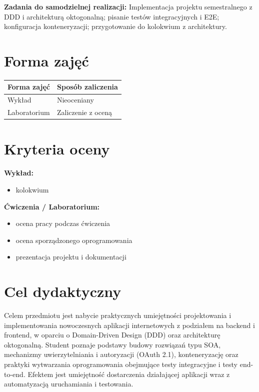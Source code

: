 \documentclass[12pt, a4paper]{article}
\newcommand{\thdrule}{\noalign{\global\setlength{\extrarowheight}{0pt}}}
\newcommand{\thdend}{\noalign{\global\setlength{\extrarowheight}{3pt}}}
\begin{document}
\vspace{4pt}
\noindent\textbf{Zadania do samodzielnej realizacji:} Implementacja projektu semestralnego z DDD i architekturą oktogonalną; pisanie testów integracyjnych i E2E; konfiguracja konteneryzacji; przygotowanie do kolokwium z architektury.

\section{Forma zajęć}

\begin{center}
{\scriptsize
\begin{tabular}{m{5cm}m{8cm}}
\thdrule\toprule
\rowcolor{pjatkRed} {\color{white}\textbf{Forma zajęć}} & {\color{white}\textbf{Sposób zaliczenia}} \\
\midrule\thdend
  \rowcolor{tableRowLight} Wykład & Nieoceniany \\
  \rowcolor{tableRowAlt} Laboratorium & Zaliczenie z oceną \\
\bottomrule
\end{tabular}}
\end{center}

\section{Kryteria oceny}

\textbf{Wykład:}
\begin{itemize}
  \item kolokwium
\end{itemize}
\vspace{4pt}
\textbf{Ćwiczenia / Laboratorium:}
\begin{itemize}
  \item ocena pracy podczas ćwiczenia
  \item ocena sporządzonego oprogramowania
  \item prezentacja projektu i dokumentacji
\end{itemize}


\section{Cel dydaktyczny}

Celem przedmiotu jest nabycie praktycznych umiejętności projektowania i implementowania nowoczesnych aplikacji internetowych z podziałem na backend i frontend, w oparciu o Domain-Driven Design (DDD) oraz architekturę oktogonalną. Student poznaje podstawy budowy rozwiązań typu SOA, mechanizmy uwierzytelniania i autoryzacji (OAuth 2.1), konteneryzację oraz praktyki wytwarzania oprogramowania obejmujące testy integracyjne i testy end-to-end. Efektem jest umiejętność dostarczenia działającej aplikacji wraz z automatyzacją uruchamiania i testowania.
\end{document}
